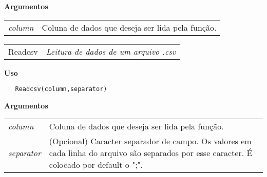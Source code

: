 \vspace{0.5cm}

\textbf{Argumentos}

\begin{table}[!ht]
\begin{center}
\begin{tabularx}{\textwidth}{X X}
\hspace{0.5cm} \textit{column} & Coluna de dados que deseja ser lida pela função.\\
\end{tabularx}
\end{center}
\end{table} 

\newpage



\hrulefill   

\begin{table}[!ht]
\begin{center}
\begin{tabularx}{\textwidth}{ X X}
\hspace{0.5cm} Readcsv & \textit{Leitura de dados de um arquivo .csv}\\
\end{tabularx}
\end{center}
\end{table} 

\vspace{-0.5cm}

\hrulefill  

\vspace{0.5cm}

\textbf{Uso}

\begin{lstlisting}
   Readcsv(column,separator)
\end{lstlisting}

\vspace{0.5cm}

\textbf{Argumentos}

\begin{table}[!ht]
\begin{center}
\begin{tabularx}{\textwidth}{X X}
\hspace{0.5cm} \textit{column} & Coluna de dados que deseja ser lida pela função.\\
\hspace{0.5cm} \textit{separator} & (Opcional) Caracter separador de campo. Os valores em cada linha do arquivo são separados por esse caracter. É colocado por default o ";".\\
\end{tabularx}
\end{center}
\end{table} 


